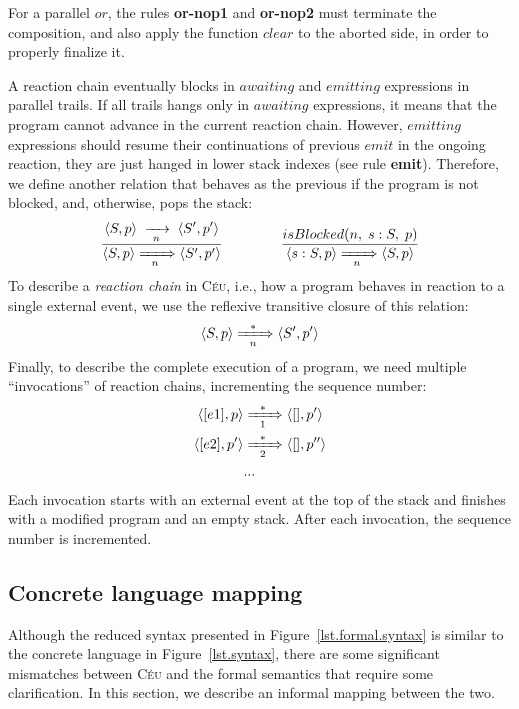 \documentclass{sigplanconf}
\newcommand{\CEU}{\textsc{C\'{e}u}\xspace}
\newcommand{\ST}{\1\xrightarrow[~n~]{}\1}
\newcommand{\LL}{\langle}
\newcommand{\RR}{\rangle}
\newcommand{\DS}{\displaystyle}
\newcommand{\1}{\;}
\newcommand{\2}{\;\;}
\newcommand{\3}{\;\;\;}
\newcommand{\5}{\;\;\;\;\;}
\begin{document}
For a parallel $or$, the rules \textbf{or-nop1} and \textbf{or-nop2} must 
terminate the composition, and also apply the function $clear$ to the aborted 
side, in order to properly finalize it.

A reaction chain eventually blocks in $awaiting$ and $emitting$ expressions in 
parallel trails.
%
If all trails hangs only in $awaiting$ expressions, it means that the program 
cannot advance in the current reaction chain.
%
However, $emitting$ expressions should resume their continuations of previous 
$emit$ in the ongoing reaction, they are just hanged in lower stack indexes 
(see rule \textbf{emit}).
%
Therefore, we define another relation that behaves as the previous if the 
program is not blocked, and, otherwise, pops the stack:
%
$$
\frac
    { \DS \LL S,p \RR \ST                   \LL S',p' \RR }
    {     \LL S,p \RR \xRightarrow[~~n~~]{} \LL S',p' \RR }
%
\5\5\5
%
\frac
    { \DS isBlocked(n,\1s:S,\1p) }
    { \LL s:S,p \RR \xRightarrow[~~n~~]{} \LL S,p \RR }
$$
%
To describe a \emph{reaction chain} in \CEU, i.e., how a program behaves in 
reaction to a single external event, we use the reflexive transitive closure of 
this relation:
%
$$
    \LL S,p \RR \xRightarrow[~~n~~]{*} \LL S',p' \RR
$$
%
Finally, to describe the complete execution of a program, we need multiple 
``invocations'' of reaction chains, incrementing the sequence number:
%
\begin{align*}
\LL [e1], p \RR
    & \xRightarrow[~~1~~]{*}
\LL [  ], p' \RR
\\
\LL [e2], p' \RR
    & \xRightarrow[~~2~~]{*}
\LL [  ], p'' \RR
\\
& ...
\end{align*}
%
Each invocation starts with an external event at the top of the stack and 
finishes with a modified program and an empty stack.
After each invocation, the sequence number is incremented.

\subsection{Concrete language mapping}

Although the reduced syntax presented in Figure~\ref{lst.formal.syntax} is 
similar to the concrete language in Figure~\ref{lst.syntax}, there are some 
significant mismatches between \CEU and the formal semantics that require some 
clarification.
In this section, we describe an informal mapping between the two.
\end{document}
